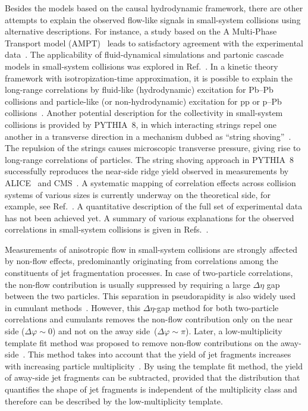 Besides the models based on the causal hydrodynamic framework, there are other attempts to explain the observed flow-like signals in small-system collisions using alternative descriptions. 
For instance, a study based on the A Multi-Phase Transport model (AMPT)~\cite{Lin:2004en} leads to satisfactory agreement with the experimental data~\cite{OrjuelaKoop:2015jss}. The applicability of fluid-dynamical simulations and partonic cascade models in small-system collisions was explored in Ref.~\cite{Gallmeister:2018mcn}. In a kinetic theory framework with isotropization-time approximation, it is possible to explain the long-range correlations by fluid-like (hydrodynamic) excitation for Pb--Pb collisions and particle-like (or non-hydrodynamic) excitation for pp or p--Pb collisions~\cite{Kurkela:2019kip,Kurkela:2020wwb,Ambrus:2021fej}. Another potential description for the collectivity in small-system collisions is provided by PYTHIA~8, in which interacting strings repel one another in a transverse direction in a mechanism dubbed as ``string shoving''~\cite{Bierlich:2017vhg,Bierlich:2019ixq}. The repulsion of the strings causes microscopic transverse pressure, giving rise to long-range correlations of particles. The string shoving approach in PYTHIA~8 successfully reproduces the near-side ridge yield observed in measurements by ALICE~\cite{ALICE:2021nir} and CMS~\cite{Khachatryan:2016txc}. A systematic mapping of correlation effects across collision systems of various sizes is currently underway on the theoretical side, for example, see Ref.~\cite{Schenke:2020mbo}. A quantitative description of the full set of experimental data has not been achieved yet. A summary of various explanations for the observed correlations in small-system collisions is given in Refs.~\cite{Strickland:2018exs,Loizides:2016tew,Nagle:2018nvi}. 

Measurements of anisotropic flow in small-system collisions are strongly affected by non-flow effects, predominantly originating from correlations among the constituents of jet fragmentation processes.
In case of two-particle correlations, the non-flow contribution is usually suppressed by requiring a large $\Delta\eta$ gap between the two particles. This separation in pseudorapidity is also widely used in cumulant methods~\cite{Bilandzic:2010jr, Acharya:2019vdf}. However, this $\Delta\eta$-gap method for both two-particle correlations and cumulants removes the non-flow contribution only on the near side ($\Delta\varphi\sim0$) and not on the away side~($\Delta\varphi\sim\pi$). Later, a low-multiplicity template fit method was proposed to remove non-flow contributions on the away-side~\cite{ATLAS:2015hzw, ATLAS:2016yzd, ATLAS:2018ngv}. This method takes into account that the yield of jet fragments increases with increasing particle multiplicity~\cite{CMS:2013ycn, ALICE:2013tla, ALICE:2014mas}.
By using the template fit method, the yield of away-side jet fragments can be subtracted, provided that the distribution that quantifies the shape of jet fragments is independent of the multiplicity class and therefore can be described by the low-multiplicity template.

